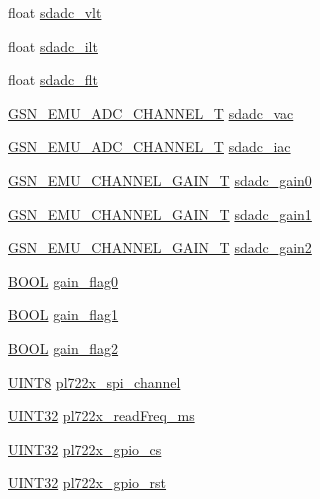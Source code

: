 \begin{DoxyCompactItemize}
float \hyperlink{a00058_aef6392f3eeeb4ef56a69377a6d976db0}{sdadc\_\-vlt}
\item 
float \hyperlink{a00058_a0538001757e3a34278514a6db3dc0181}{sdadc\_\-ilt}
\item 
float \hyperlink{a00058_a243eb8c9f95c247490b3dea1b8a407c4}{sdadc\_\-flt}
\item 
\hyperlink{a00663_gaa251b8ce4165f71014388dea20af4369}{GSN\_\-EMU\_\-ADC\_\-CHANNEL\_\-T} \hyperlink{a00058_adeb4fb9640ae27d76d4dbecd6dfea527}{sdadc\_\-vac}
\item 
\hyperlink{a00663_gaa251b8ce4165f71014388dea20af4369}{GSN\_\-EMU\_\-ADC\_\-CHANNEL\_\-T} \hyperlink{a00058_a0906728692004de5f899760897844979}{sdadc\_\-iac}
\item 
\hyperlink{a00663_ga28c8e45a08f0c7cfb9b129f54d3d3dcc}{GSN\_\-EMU\_\-CHANNEL\_\-GAIN\_\-T} \hyperlink{a00058_a2a6c84b950292bc3d52b6260a1115e89}{sdadc\_\-gain0}
\item 
\hyperlink{a00663_ga28c8e45a08f0c7cfb9b129f54d3d3dcc}{GSN\_\-EMU\_\-CHANNEL\_\-GAIN\_\-T} \hyperlink{a00058_a382ce5f5e5dc11c6942003e96754970a}{sdadc\_\-gain1}
\item 
\hyperlink{a00663_ga28c8e45a08f0c7cfb9b129f54d3d3dcc}{GSN\_\-EMU\_\-CHANNEL\_\-GAIN\_\-T} \hyperlink{a00058_a4ea97943af9d2e5f6e88c7a5312c995f}{sdadc\_\-gain2}
\item 
\hyperlink{a00660_ga1f04022c0a182c51c059438790ea138c}{BOOL} \hyperlink{a00058_a3d49099fd795c8db6095955c47fd8bad}{gain\_\-flag0}
\item 
\hyperlink{a00660_ga1f04022c0a182c51c059438790ea138c}{BOOL} \hyperlink{a00058_a698528138124647d5a7382f5de1f51aa}{gain\_\-flag1}
\item 
\hyperlink{a00660_ga1f04022c0a182c51c059438790ea138c}{BOOL} \hyperlink{a00058_a68a3dfdb7b84fcbf4d3b6159019930f1}{gain\_\-flag2}
\item 
\hyperlink{a00660_gab27e9918b538ce9d8ca692479b375b6a}{UINT8} \hyperlink{a00058_acfb3ddea6819d5565b7bee5bdd386b4a}{pl722x\_\-spi\_\-channel}
\item 
\hyperlink{a00660_gae1e6edbbc26d6fbc71a90190d0266018}{UINT32} \hyperlink{a00058_abe3244e8b0e052d4011ea6e658a9c7dd}{pl722x\_\-readFreq\_\-ms}
\item 
\hyperlink{a00660_gae1e6edbbc26d6fbc71a90190d0266018}{UINT32} \hyperlink{a00058_a9bff9cf228bf2cc117908031cec7c372}{pl722x\_\-gpio\_\-cs}
\item 
\hyperlink{a00660_gae1e6edbbc26d6fbc71a90190d0266018}{UINT32} \hyperlink{a00058_aef2c05804c320566c9800607c78ed09d}{pl722x\_\-gpio\_\-rst}
\end{DoxyCompactItemize}


